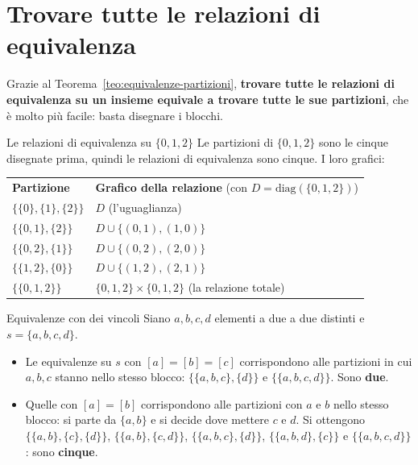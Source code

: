 \section{Trovare tutte le relazioni di equivalenza}\label{sec:trovare-equivalenze}

Grazie al Teorema~\ref{teo:equivalenze-partizioni}, \textbf{trovare tutte le relazioni di equivalenza su un insieme equivale a
trovare tutte le sue partizioni}, che è molto più facile: basta disegnare i blocchi.

\begin{esempio}{Le relazioni di equivalenza su $\{0, 1, 2\}$}
    Le partizioni di $\{0, 1, 2\}$ sono le cinque disegnate prima, quindi le relazioni di equivalenza sono cinque. I loro grafici:
    \begin{center}
    \renewcommand{\arraystretch}{1.3}
    \begin{tabular}{l|l}
        \rowcolor{primary!12} \textbf{Partizione} & \textbf{Grafico della relazione} (con $D = \mathrm{diag}(\{0, 1, 2\})$) \\
        $\{\{0\}, \{1\}, \{2\}\}$ & $D$ \quad (l'uguaglianza) \\
        $\{\{0, 1\}, \{2\}\}$ & $D \cup \{(0, 1), (1, 0)\}$ \\
        $\{\{0, 2\}, \{1\}\}$ & $D \cup \{(0, 2), (2, 0)\}$ \\
        $\{\{1, 2\}, \{0\}\}$ & $D \cup \{(1, 2), (2, 1)\}$ \\
        $\{\{0, 1, 2\}\}$ & $\{0, 1, 2\} \times \{0, 1, 2\}$ \quad (la relazione totale) \\
    \end{tabular}
    \end{center}
\end{esempio}

\begin{esempio}{Equivalenze con dei vincoli}
    Siano $a, b, c, d$ elementi a due a due distinti e $s = \{a, b, c, d\}$.
    \begin{itemize}
        \item Le equivalenze su $s$ con $[a] = [b] = [c]$ corrispondono alle partizioni in cui $a, b, c$ stanno nello stesso blocco:
              $\{\{a, b, c\}, \{d\}\}$ e $\{\{a, b, c, d\}\}$. Sono \textbf{due}.
        \item Quelle con $[a] = [b]$ corrispondono alle partizioni con $a$ e $b$ nello stesso blocco: si parte da $\{a, b\}$ e si
              decide dove mettere $c$ e $d$. Si ottengono $\{\{a, b\}, \{c\}, \{d\}\}$, $\{\{a, b\}, \{c, d\}\}$, $\{\{a, b, c\}, \{d\}\}$,
              $\{\{a, b, d\}, \{c\}\}$ e $\{\{a, b, c, d\}\}$: sono \textbf{cinque}.
    \end{itemize}
\end{esempio}

